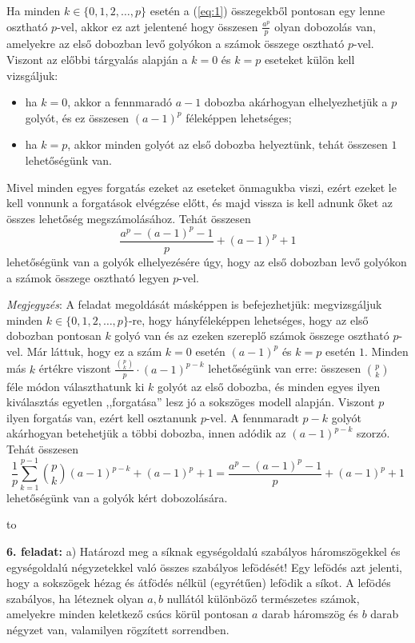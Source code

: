 \documentclass[a4paper,10pt]{article}
\newcommand{\vonal}{\hbox to \hsize{\hskip2truecm\hrulefill\hskip2truecm}}
\begin{document}
    Ha minden $k\in\{0,1,2,\dots,p\}$ esetén a (\ref{eq:1}) összegekből pontosan egy lenne osztható $p$-vel, akkor ez azt jelentené hogy összesen $\frac{a^p}{p}$ olyan dobozolás van, amelyekre az első dobozban levő golyókon a számok összege osztható $p$-vel. Viszont az előbbi tárgyalás alapján a $k=0$ és $k=p$ eseteket k\" ulön kell vizsgáljuk:
    \begin{itemize}
        \item ha $k = 0$, akkor a fennmaradó $a-1$ dobozba akárhogyan elhelyezhetj\" uk a $p$ golyót, és ez összesen $(a-1)^p$ féleképpen lehetséges;
        \item ha $k = p$, akkor minden golyót az első dobozba helyezt\" unk, tehát összesen $1$ lehetőség\" unk van.
    \end{itemize}
    Mivel minden egyes forgatás ezeket az eseteket önmagukba viszi, ezért
    ezeket le kell vonnunk a forgatások elvégzése előtt, és majd vissza is kell adnunk őket az összes lehetőség
megszámolásához. Tehát összesen
    \[
        \frac{a^{p}-{(a-1)^p-1}}{p} + (a-1)^{p} + 1
    \]
    lehetőség\" unk van a golyók elhelyezésére úgy, hogy az első
    do\-boz\-ban levő golyókon a számok összege osztható legyen $p$-vel.

\medskip
\textit{Megjegyzés}:   A feladat megoldását másképpen is befejezhet\-j\" uk: megvizsgáljuk minden
    $k\in\{0,1,2,\dots,p\}$-re, hogy hány\-féle\-képpen lehetséges, hogy az első dobozban
    pontosan $k$ golyó van és az ezeken szereplő számok összege osztható $p$-vel.
     Már láttuk, hogy ez a szám $k = 0$ esetén $(a-1)^p$ és $k = p$ esetén $1$.
      Minden más $k$ értékre viszont $\frac{{p \choose k}}{p}\cdot (a-1)^{p-k}$
      lehetőség\" unk van erre: összesen ${p \choose k}$ féle módon
      választhatunk  ki  $k$ golyót az első dobozba, és minden egyes ilyen kiválasztás
      egyetlen ,,forgatása'' lesz jó a sokszöges modell alapján. Viszont $p$ ilyen forgatás
      van, ezért kell osztanunk $p$-vel. A fennmaradt $p-k$ golyót akárhogyan betehetj\" uk a
      többi dobozba, innen adódik az $(a-1)^{p-k}$ szorzó.
    Tehát összesen
    \[
        \frac{1}{p}\sum_{k=1}^{p-1}{p \choose k}(a-1)^{p-k} + (a-1)^{p} + 1 = \frac{a^{p}-{(a-1)^p-1}}{p} + (a-1)^{p} + 1
    \]
    lehetőség\" unk van a golyók kért dobozolására.

\medskip
\vonal

{\bf 6. feladat: } a) Határozd meg a síknak egységoldalú szabályos
háromszögekkel és egy\-ség\-oldalú négyzetekkel való
összes szabályos lefödését! Egy lefödés azt jelenti,
hogy a sokszögek hézag és átfödés nélkül (egyrétűen) lefödik a síkot. A lefödés szabályos, ha léteznek
olyan $a,b$ nullától különböző természetes számok,
a\-me\-lyekre minden keletkező csúcs körül pontosan $a$
darab háromszög és $b$ darab négyzet van, valamilyen
rögzített sorrendben.
\end{document}
